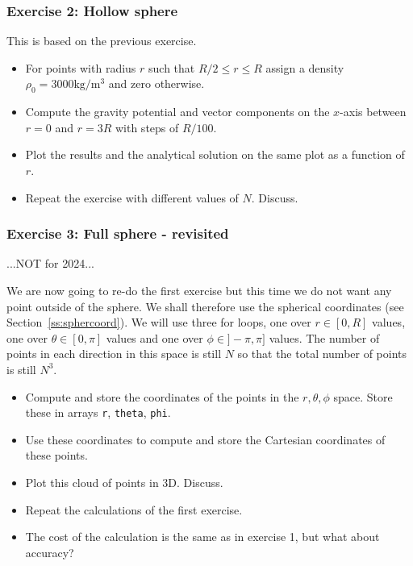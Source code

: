 \subsubsection*{Exercise 2: Hollow sphere}

This is based on the previous exercise. 
\begin{itemize}
\item For points with radius $r$ such that $R/2 \le r \le R$ assign a density $\rho_0=3000\si{\kilo\gram\per\cubic\metre}$ 
and zero otherwise.
\item Compute the gravity potential and vector components on the $x$-axis between $r=0$ and $r=3R$ 
with steps of $R/100$.
\item Plot the results and the analytical solution on the same plot as a function of $r$.
\item Repeat the exercise with different values of $N$. Discuss.
\end{itemize}




\subsubsection*{Exercise 3: Full sphere - revisited}

...NOT for 2024...

We are now going to re-do the first exercise but this time we do not want any point outside of the sphere. 
We shall therefore use the spherical coordinates (see Section~\ref{ss:sphercoord}).
We will use three for loops, one over $r\in[0,R]$ values, 
one over $\theta\in[0,\pi]$ values and one over $\phi\in]-\pi,\pi]$ values. The number 
of points in each direction in this space is still $N$ so that the total number of points is
still $N^3$.

\begin{itemize}
\item Compute and store the coordinates of the points in the $r,\theta,\phi$ space. Store 
these in arrays {\tt r}, {\tt theta}, {\tt phi}.
\item Use these coordinates to compute and store the Cartesian coordinates of these points. 
\item Plot this cloud of points in 3D. Discuss.
\item Repeat the calculations of the first exercise.
\item The cost of the calculation is the same as in exercise 1, but what about accuracy?
\end{itemize}


